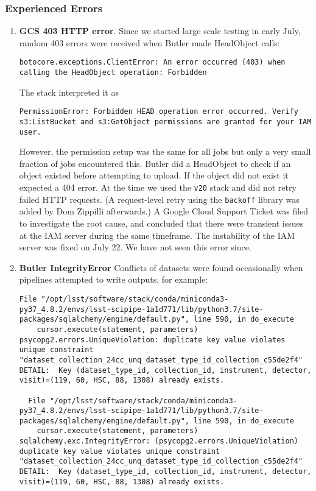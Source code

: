 \subsubsection{Experienced Errors}
\begin{enumerate}
\item \textbf{GCS 403 HTTP error}.
Since we started large scale testing in early July, random 403 errors were received when Butler made HeadObject calls:
\begin{lstlisting}[style=basherror]
botocore.exceptions.ClientError: An error occurred (403) when calling the HeadObject operation: Forbidden
\end{lstlisting}
The stack interpreted it as
\begin{lstlisting}[style=basherror]
PermissionError: Forbidden HEAD operation error occurred. Verify s3:ListBucket and s3:GetObject permissions are granted for your IAM user.
\end{lstlisting}
However, the permission setup was the same for all jobs but only a very small fraction of jobs encountered this.
Butler did a HeadObject to check if an object existed before attempting to upload.
If the object did not exist it expected a 404 error.
At the time we used the \texttt{v20} stack and did not retry failed HTTP requests.
(A request-level retry using the \texttt{backoff} library was added by Dom Zippilli afterwards.)
A Google Cloud Support Ticket was filed to investigate the root cause, and concluded that there were transient issues at the IAM server during the same timeframe.
The instability of the IAM server was fixed on July 22.
We have not seen this error since.


\item  \textbf{Butler IntegrityError}
Conflicts of datasets were found occasionally when pipelines attempted to write outputs, for example:
\begin{lstlisting}[style=basherror]
  File "/opt/lsst/software/stack/conda/miniconda3-py37_4.8.2/envs/lsst-scipipe-1a1d771/lib/python3.7/site-packages/sqlalchemy/engine/default.py", line 590, in do_execute
    cursor.execute(statement, parameters)
psycopg2.errors.UniqueViolation: duplicate key value violates unique constraint "dataset_collection_24cc_unq_dataset_type_id_collection_c55de2f4"
DETAIL:  Key (dataset_type_id, collection_id, instrument, detector, visit)=(119, 60, HSC, 88, 1308) already exists.

  File "/opt/lsst/software/stack/conda/miniconda3-py37_4.8.2/envs/lsst-scipipe-1a1d771/lib/python3.7/site-packages/sqlalchemy/engine/default.py", line 590, in do_execute
    cursor.execute(statement, parameters)
sqlalchemy.exc.IntegrityError: (psycopg2.errors.UniqueViolation) duplicate key value violates unique constraint "dataset_collection_24cc_unq_dataset_type_id_collection_c55de2f4"
DETAIL:  Key (dataset_type_id, collection_id, instrument, detector, visit)=(119, 60, HSC, 88, 1308) already exists.



\end{lstlisting}
\end{enumerate}
